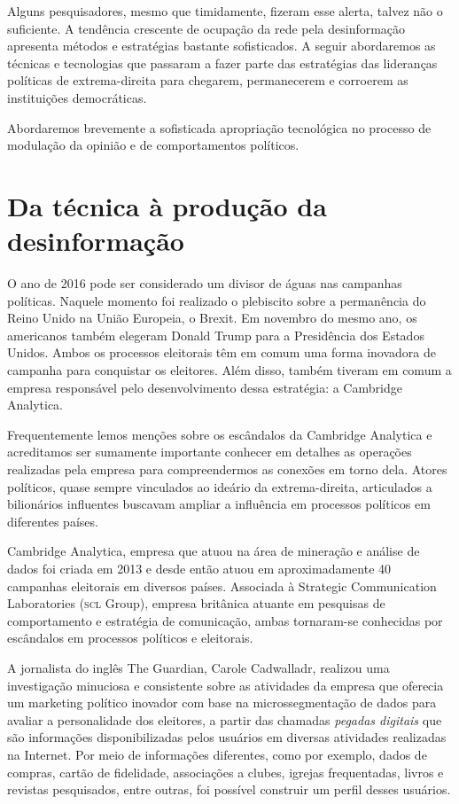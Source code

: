Alguns pesquisadores, mesmo que timidamente, fizeram esse alerta, talvez
não o suficiente. A tendência crescente de ocupação da rede pela
desinformação apresenta métodos e estratégias bastante sofisticados. A
seguir abordaremos as técnicas e tecnologias que passaram a fazer parte
das estratégias das lideranças políticas de extrema-direita para
chegarem, permanecerem e corroerem as instituições democráticas.

Abordaremos brevemente a sofisticada apropriação tecnológica no processo
de modulação da opinião e de comportamentos políticos.

\section{Da técnica à produção da desinformação}

O ano de 2016 pode ser considerado um divisor de águas nas campanhas
políticas. Naquele momento foi realizado o plebiscito sobre a
permanência do Reino Unido na União Europeia, o Brexit. Em novembro do
mesmo ano, os americanos também elegeram Donald Trump para a Presidência
dos Estados Unidos. Ambos os processos eleitorais têm em comum uma
forma inovadora de campanha para conquistar os eleitores. Além disso,
também tiveram em comum a empresa responsável pelo desenvolvimento dessa
estratégia: a Cambridge Analytica.

Frequentemente lemos menções sobre os escândalos da Cambridge Analytica
e acreditamos ser sumamente importante conhecer em detalhes as operações
realizadas pela empresa para compreendermos as conexões em torno dela.
Atores políticos, quase sempre vinculados ao ideário da extrema-direita,
articulados a bilionários influentes buscavam ampliar a influência em
processos políticos em diferentes países.

Cambridge Analytica, empresa que atuou na área de mineração e análise de
dados foi criada em 2013 e desde então atuou em aproximadamente 40
campanhas eleitorais em diversos países. Associada à Strategic
Communication Laboratories (\textsc{scl} Group), empresa britânica atuante em
pesquisas de comportamento e estratégia de comunicação, ambas tornaram-se
conhecidas por escândalos em processos políticos e eleitorais.

A jornalista do inglês The Guardian, Carole Cadwalladr, realizou
uma investigação minuciosa e consistente sobre as atividades da empresa
que oferecia um marketing político inovador com base na
microssegmentação de dados para avaliar a personalidade dos eleitores, a
partir das chamadas \textit{pegadas digitais} que são informações
disponibilizadas pelos usuários em diversas atividades realizadas na
Internet. Por meio de informações diferentes, como por exemplo, dados de
compras, cartão de fidelidade, associações a clubes, igrejas
frequentadas, livros e revistas pesquisados, entre outras, foi possível
construir um perfil desses usuários.

